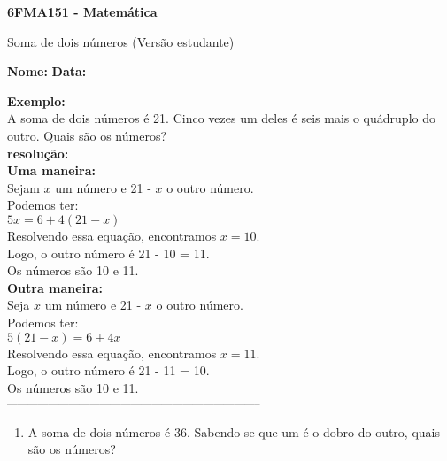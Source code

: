 \documentclass[a4paper,14pt]{article}
\begin{document}
	
	\noindent\textbf{6FMA151 - Matemática} 
	
	\begin{center}Soma de dois números (Versão estudante)
	\end{center}
	
	\noindent\textbf{Nome:} \underline{\hspace{10cm}}
	\noindent\textbf{Data:} \underline{\hspace{4cm}}
	
	
	\begin{multicols}{2}
	    \noindent \textbf{Exemplo: } \\
	    A soma de dois números é 21. Cinco vezes um deles é seis mais o quádruplo do outro. Quais são os números? \\
	    \noindent \textbf{resolução: } \\
	    \noindent \textbf{Uma maneira: } \\
	    Sejam $x$ um número e 21 - $x$ o outro número. \\
	    Podemos ter: \\
	    $5x = 6 + 4(21 - x)$ \\
	    Resolvendo essa equação, encontramos $x = 10$. \\
	    Logo, o outro número é 21 - 10 = 11. \\
	    Os números são 10 e 11. \\
	    \noindent \textbf{Outra maneira: } \\
	    Seja $x$ um número e 21 - $x$ o outro número. \\
	    Podemos ter: \\
	    $5(21 - x) = 6 + 4x$ \\
	    Resolvendo essa equação, encontramos $x = 11$. \\
	    Logo, o outro número é 21 - 11 = 10. \\
	    Os números são 10 e 11. \\
		\noindent\textsubscript{--------------------------------------------------------------------------}
		\begin{enumerate} 
			\item A soma de dois números é 36. Sabendo-se que um é o dobro do outro, quais são os números? \\\\\\\\\\\\

\end{enumerate}
\end{multicols}
\end{document}
